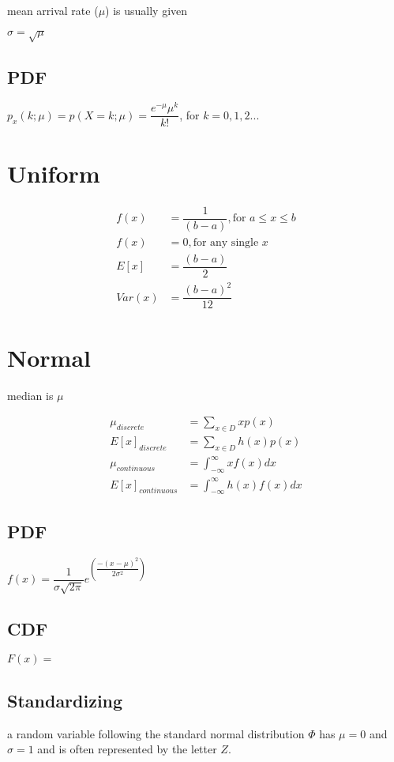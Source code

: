 \documentclass[12pt,fleqn]{article}
\begin{document}
mean arrival rate ($\mu$) is usually given

$\sigma = \sqrt{\mu}$

\subsection{PDF}
$p_x(k;\mu) = p(X=k; \mu) = \dfrac{e^{-\mu}\mu^k}{k!}$, for $k = 0,1,2...$
\section{Uniform}

\begin{align*}
	f(x) &= \dfrac{1}{(b-a)}, \text{for $a \le x \le b$}\\
	f(x) &= 0, \text{for any single $x$}\\
	E[x] &= \dfrac{(b-a)}{2}\\
	Var(x) &=\dfrac{(b-a)^2}{12}
\end{align*}

\section{Normal}

median is $\mu$

\begin{align*}
	\mu_{discrete} &= \sum_{x \in D} x p(x)\\
	E[x]_{discrete} &= \sum_{x \in D} h(x) p(x)\\
	\mu_{continuous} &= \int_{-\infty}^{\infty} x f(x) dx\\
	E[x]_{continuous} &= \int_{-\infty}^{\infty} h(x) f(x) dx
\end{align*}

\subsection{PDF}
$f(x) = \dfrac{1}{\sigma\sqrt{2\pi}}e^{(\dfrac{-(x-\mu)^2}{2\sigma^2})}$
\subsection{CDF}
$F(x) = $

\subsection{Standardizing}
a random variable following the standard normal distribution $\Phi$ has $\mu = 0$ and $\sigma = 1$ and is often represented by the letter $Z$.
\end{document}
